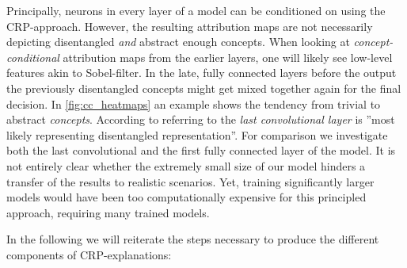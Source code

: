 Principally, neurons in every layer of a model can be conditioned on using the CRP-approach. However, the resulting attribution maps are not necessarily depicting disentangled \textit{and} abstract enough concepts. When looking at \textit{concept-conditional} attribution maps from the earlier layers, one will likely see low-level features akin to Sobel-filter. In the late, fully connected layers before the output the previously disentangled concepts might get mixed together again for the final decision. In \cref{fig:cc_heatmaps} an example shows the tendency from trivial to abstract \textit{concepts}. 
According to \cite{Dreyer2023a} referring to \cite{Zeiler2013} the \textit{last convolutional layer} is ''most likely representing disentangled representation''. For comparison we investigate both the last convolutional and the first fully connected layer of the model. It is not entirely clear whether the extremely small size of our model hinders a transfer of the results to realistic scenarios. Yet, training significantly larger models would have been too computationally expensive for this principled approach, requiring many trained models.

In the following we will reiterate the steps necessary to produce the different components of CRP-explanations:

